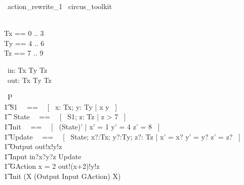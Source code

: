 % 
\begin{zsection}
  \SECTION\ action\_rewrite\_1 \parents\ circus\_toolkit
\end{zsection}

\begin{zed}
    [T] \\
	Tx == 0 .. 3 \\ 
	Ty == 4 .. 6 \\ 
	Tz == 7 .. 9 \\ 
\end{zed}

\begin{circus}
	\circchannel\ in: Tx \cross Ty \cross Tz \\
	\circchannel\ out: Tx \cross Ty \cross Tz \\
\end{circus}

\begin{circus}
    \circprocess\ P \circdef \circbegin \\
        \t1 S1 ~~==~~ [~  x: Tx; y: Ty | x  \land y  ~] \\
        \t1 \circstate\ State ~~==~~ [~ S1; z: Tz | z > 7 ~] \\
        \t1 Init ~~==~~ [~ (State)' | x' = 1 \land y' = 4 \land z' = 8 ~] \\
        \t1 Update ~~==~~ [~ \Delta State; x?:Tx; y?:Ty; z?: Tz | x' = x? \land y' = y? \land z' = z? ~] \\
        \t1 Output \circdef out!x!y!z \then \Skip \\
        \t1 Input \circdef in?x?y?z \then \lschexpract Update \rschexpract \\
        \t1 GAction \circdef \lcircguard x = 2 \rcircguard \circguard out!(x+2)!y!z \then \Skip \\
        \t1 \circspot \lschexpract Init \rschexpract \circseq (\circmu X \circspot (Output \extchoice Input \extchoice GAction) \circseq X) \\ 
	\circend
\end{circus}

